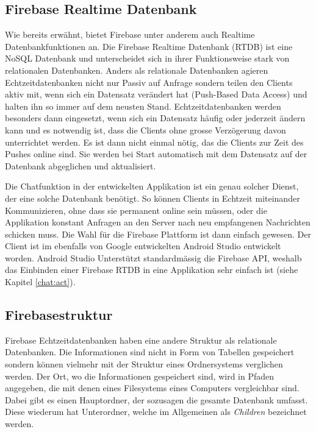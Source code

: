 \documentclass[a4paper,11pt]{report}
\begin{document}
				\subsection{Firebase Realtime Datenbank} \label{realtime}
				Wie bereits erwähnt, bietet Firebase unter anderem auch Realtime Datenbankfunktionen an. Die Firebase Realtime Datenbank (RTDB) ist eine NoSQL Datenbank und unterscheidet sich in ihrer Funktionsweise stark von relationalen Datenbanken. Anders als relationale Datenbanken agieren Echtzeitdatenbanken nicht nur Passiv auf Anfrage sondern teilen den Clients aktiv mit, wenn sich ein Datensatz verändert hat (Push-Based Data Access) und halten ihn so immer auf dem neusten Stand. Echtzeitdatenbanken werden besonders dann eingesetzt, wenn sich ein Datensatz häufig oder jederzeit ändern kann und es notwendig ist, dass die Clients ohne grosse Verzögerung davon unterrichtet werden.\cite{RealtimeDatabase} Es ist dann nicht einmal nötig, das die Clients zur Zeit des Pushes online sind. Sie werden bei Start automatisch mit dem Datensatz auf der Datenbank abgeglichen und aktualisiert.\cite{FirebaseRTDB}
				
				Die Chatfunktion in der entwickelten Applikation ist ein genau solcher Dienst, der eine solche Datenbank benötigt. So können Clients in Echtzeit miteinander Kommunizieren, ohne dass sie permanent online sein müssen, oder die Applikation konstant Anfragen an den Server nach neu empfangenen Nachrichten schicken muss. Die Wahl für die Firebase Plattform ist dann einfach gewesen. Der Client ist im ebenfalls von Google entwickelten Android Studio entwickelt worden. Android Studio Unterstützt standardmässig die Firebase API, weshalb das Einbinden einer Firebase RTDB in eine Applikation sehr einfach ist (siehe Kapitel \ref{chat:act}).
				
				\subsection{Firebasestruktur}
				Firebase Echtzeitdatenbanken haben eine andere Struktur als relationale Datenbanken. Die Informationen sind nicht in Form von Tabellen gespeichert sondern können vielmehr mit der Struktur eines Ordnersystems verglichen werden. Der Ort, wo die Informationen gespeichert sind, wird in Pfaden angegeben, die mit denen eines Filesystems eines Computers vergleichbar sind. Dabei gibt es einen Hauptordner, der sozusagen die gesamte Datenbank umfasst. Diese wiederum hat Unterordner, welche im Allgemeinen als \emph{Children} bezeichnet werden.
				
\end{document}

